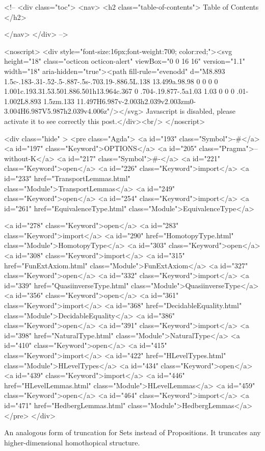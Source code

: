   <!-- 
  <div class="toc">
    <nav>
    <h2 class="table-of-contents"> Table of Contents </h2>
      

    </nav>
  </div>
   -->

  <noscript>
  <div style="font-size:16px;font-weight:700; color:red;"><svg height="18" class="octicon octicon-alert" viewBox="0 0 16 16" version="1.1" width="18" aria-hidden="true"><path fill-rule="evenodd" d="M8.893 1.5c-.183-.31-.52-.5-.887-.5s-.703.19-.886.5L.138 13.499a.98.98 0 0 0 0 1.001c.193.31.53.501.886.501h13.964c.367 0 .704-.19.877-.5a1.03 1.03 0 0 0 .01-1.002L8.893 1.5zm.133 11.497H6.987v-2.003h2.039v2.003zm0-3.004H6.987V5.987h2.039v4.006z"/></svg> Javascript is disabled, please activate it to see correctly this post.</div><br/>
  </noscript>

  <div class="hide" >
<pre class="Agda">
<a id="193" class="Symbol">{-#</a> <a id="197" class="Keyword">OPTIONS</a> <a id="205" class="Pragma">--without-K</a> <a id="217" class="Symbol">#-}</a>
<a id="221" class="Keyword">open</a> <a id="226" class="Keyword">import</a> <a id="233" href="TransportLemmas.html" class="Module">TransportLemmas</a>
<a id="249" class="Keyword">open</a> <a id="254" class="Keyword">import</a> <a id="261" href="EquivalenceType.html" class="Module">EquivalenceType</a>

<a id="278" class="Keyword">open</a> <a id="283" class="Keyword">import</a> <a id="290" href="HomotopyType.html" class="Module">HomotopyType</a>
<a id="303" class="Keyword">open</a> <a id="308" class="Keyword">import</a> <a id="315" href="FunExtAxiom.html" class="Module">FunExtAxiom</a>
<a id="327" class="Keyword">open</a> <a id="332" class="Keyword">import</a> <a id="339" href="QuasiinverseType.html" class="Module">QuasiinverseType</a>
<a id="356" class="Keyword">open</a> <a id="361" class="Keyword">import</a> <a id="368" href="DecidableEquality.html" class="Module">DecidableEquality</a>
<a id="386" class="Keyword">open</a> <a id="391" class="Keyword">import</a> <a id="398" href="NaturalType.html" class="Module">NaturalType</a>
<a id="410" class="Keyword">open</a> <a id="415" class="Keyword">import</a> <a id="422" href="HLevelTypes.html" class="Module">HLevelTypes</a>
<a id="434" class="Keyword">open</a> <a id="439" class="Keyword">import</a> <a id="446" href="HLevelLemmas.html" class="Module">HLevelLemmas</a>
<a id="459" class="Keyword">open</a> <a id="464" class="Keyword">import</a> <a id="471" href="HedbergLemmas.html" class="Module">HedbergLemmas</a>
</pre>
</div>

An analogous form of truncation for Sets instead of
Propositions. It truncates any higher-dimensional homothopical
structure.


